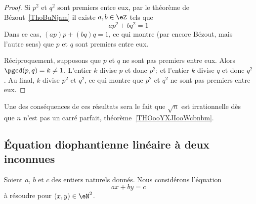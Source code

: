 \begin{proof}
    Si \( p^2\) et \( q^2\) sont premiers entre eux, par le théorème de Bézout~\ref{ThoBuNjam} il existe \( a,b\in \eZ\) tels que
    \begin{equation}
        ap^2+bq^2=1
    \end{equation}
    Dans ce cas, \( (ap)p+(bq)q=1\), ce qui montre (par encore Bézout, mais l'autre sens) que \( p\) et \( q\) sont premiers entre eux.

    Réciproquement, supposons que \( p\) et \( q\) ne sont pas premiers entre eux. Alors \( \pgcd(p,q)=k\neq 1\). L'entier \( k\) divise \( p\) et donc \( p^2\); et l'entier \( k\) divise \( q\) et donc \( q^2\). Au final, \( k\) divise \( p^2\) et \( q^2\), ce qui montre que \( p^2\) et \( q^2\) ne sont pas premiers entre eux.
\end{proof}

Une des conséquences de ces résultats sera le fait que \( \sqrt{n}\) est irrationnelle dès que \( n\) n'est pas un carré parfait, théorème~\ref{THOooYXJIooWcbnbm}.

\subsection{Équation diophantienne linéaire à deux inconnues}
\label{subsecZVKNooXNjPSf}



Soient \( a\), \( b\) et \( c\) des entiers naturels donnés. Nous considérons l'équation
\begin{equation}        \label{EqTOVSooJbxlIq}
    ax+by=c
\end{equation}
à résoudre\cite{PAYUooYVuNAB} pour \( (x,y)\in \eN^2\).


